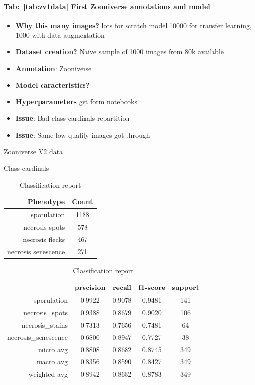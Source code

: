 \documentclass[english]{article}
\begin{document}
\paragraph{Tab:~\ref{tab:zv1data} First Zooniverse annotations and model}
\begin{itemize}
	\item \textbf{Why this many images?} lots for scratch model 10000 for transfer learning, 1000 with data augmentation
	\item \textbf{Dataset creation?} Naive sample of 1000 images from 80k available
	\item \textbf{Annotation}: Zooniverse
	\item \textbf{Model caracteristics?}~\parencite{dosovitskiyImageWorth16x162021}
	\item \textbf{Hyperparameters} get form notebooks
	\item \textbf{Issue}: Bad class cardinals repartition
	\item \textbf{Issue}: Some low quality images got through
\end{itemize}

\begin{table}[H]
	\caption{Zooniverse V2 data}\label{tab:zv2data}
	\begin{minipage}{0.4\linewidth}
		\centering
		\caption{Class cardinals}\label{tab:zoonv2classcardinals}
		\begin{tabular}{rc}
			\toprule
			Phenotype           & Count \\
			\midrule
			sporulation         & 1188  \\
			necrosis spots      & 578   \\
			necrosis flecks     & 467   \\
			necrosis senescence & 271   \\
			\bottomrule
		\end{tabular}
	\end{minipage}%
	\begin{minipage}{0.4\linewidth}
		\centering
		\caption{Classification report}\label{tab:zv2mcr}
		\begin{tabular}{rcccc}
			\toprule
			{}                   & precision & recall & f1-score & support \\
			\midrule
			sporulation          & 0.9922    & 0.9078 & 0.9481   & 141     \\
			necrosis\_spots      & 0.9388    & 0.8679 & 0.9020   & 106     \\
			necrosis\_stains     & 0.7313    & 0.7656 & 0.7481   & 64      \\
			necrosis\_senescence & 0.6800    & 0.8947 & 0.7727   & 38      \\
			micro avg            & 0.8808    & 0.8682 & 0.8745   & 349     \\
			macro avg            & 0.8356    & 0.8590 & 0.8427   & 349     \\
			weighted avg         & 0.8942    & 0.8682 & 0.8783   & 349     \\
			\bottomrule
		\end{tabular}
	\end{minipage}
\end{table}
\end{document}

